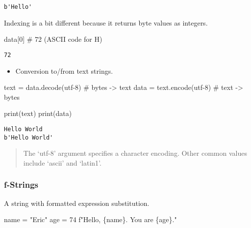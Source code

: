 \documentclass[
  letterpaper,
  DIV=11,
  numbers=noendperiod]{scrreprt}
\newenvironment{Shaded}{\begin{snugshade}}{\end{snugshade}}
\newcommand{\BuiltInTok}[1]{\textcolor[rgb]{0.00,0.46,0.62}{#1}}
\newcommand{\CommentTok}[1]{\textcolor[rgb]{0.37,0.37,0.37}{#1}}
\newcommand{\DecValTok}[1]{\textcolor[rgb]{0.68,0.00,0.00}{#1}}
\newcommand{\NormalTok}[1]{\textcolor[rgb]{0.00,0.46,0.62}{#1}}
\newcommand{\OperatorTok}[1]{\textcolor[rgb]{0.37,0.37,0.37}{#1}}
\newcommand{\SpecialCharTok}[1]{\textcolor[rgb]{0.37,0.37,0.37}{#1}}
\newcommand{\SpecialStringTok}[1]{\textcolor[rgb]{0.13,0.47,0.30}{#1}}
\newcommand{\StringTok}[1]{\textcolor[rgb]{0.13,0.47,0.30}{#1}}
\providecommand{\tightlist}{%
  \setlength{\itemsep}{0pt}\setlength{\parskip}{0pt}}
\begin{document}
\begin{verbatim}
b'Hello'
\end{verbatim}

Indexing is a bit different because it returns byte values as integers.

\begin{Shaded}
\begin{Highlighting}[]
\NormalTok{data[}\DecValTok{0}\NormalTok{]   }\CommentTok{\# 72 (ASCII code for \textquotesingle{}H\textquotesingle{})}
\end{Highlighting}
\end{Shaded}

\begin{verbatim}
72
\end{verbatim}

\begin{itemize}
\tightlist
\item
  Conversion to/from text strings.
\end{itemize}

\begin{Shaded}
\begin{Highlighting}[]
\NormalTok{text }\OperatorTok{=}\NormalTok{ data.decode(}\StringTok{\textquotesingle{}utf{-}8\textquotesingle{}}\NormalTok{) }\CommentTok{\# bytes {-}\textgreater{} text}
\NormalTok{data }\OperatorTok{=}\NormalTok{ text.encode(}\StringTok{\textquotesingle{}utf{-}8\textquotesingle{}}\NormalTok{) }\CommentTok{\# text {-}\textgreater{} bytes}

\BuiltInTok{print}\NormalTok{(text)}
\BuiltInTok{print}\NormalTok{(data)}
\end{Highlighting}
\end{Shaded}

\begin{verbatim}
Hello World
b'Hello World'
\end{verbatim}

\begin{quote}
The `utf-8' argument specifies a character encoding. Other common values
include `ascii' and `latin1'.
\end{quote}

\hypertarget{f-strings}{%
\subsubsection{f-Strings}\label{f-strings}}

A string with formatted expression substitution.

\begin{Shaded}
\begin{Highlighting}[]
\NormalTok{name }\OperatorTok{=} \StringTok{"Eric"}
\NormalTok{age }\OperatorTok{=} \DecValTok{74}
\SpecialStringTok{f"Hello, }\SpecialCharTok{\{}\NormalTok{name}\SpecialCharTok{\}}\SpecialStringTok{. You are }\SpecialCharTok{\{}\NormalTok{age}\SpecialCharTok{\}}\SpecialStringTok{."}
\end{Highlighting}
\end{Shaded}
\end{document}
